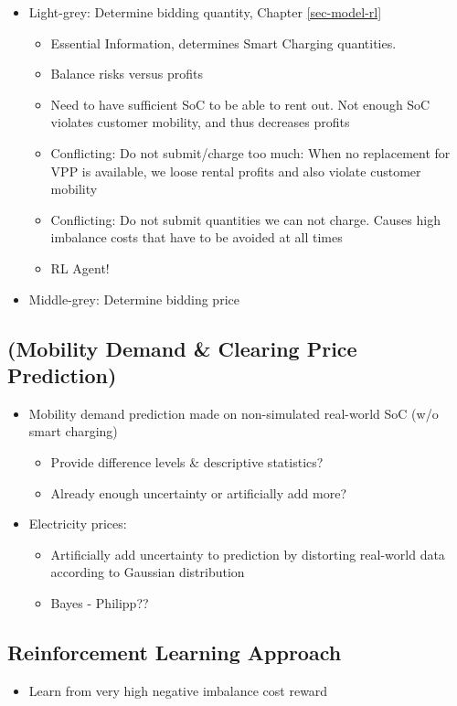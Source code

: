\documentclass[a4paper, 12pt]{article}
\begin{document}
\begin{itemize}
\item Light-grey: Determine bidding quantity, Chapter \ref{sec-model-rl}
\begin{itemize}
\item Essential Information, determines Smart Charging quantities.
\item Balance risks versus profits
\item Need to have sufficient SoC to be able to rent out. Not enough SoC violates
customer mobility, and thus decreases profits
\item Conflicting: Do not submit/charge too much: When no replacement for VPP is
available, we loose rental profits and also violate customer mobility
\item Conflicting: Do not submit quantities we can not charge. Causes high
imbalance costs that have to be avoided at all times
\item RL Agent!
\end{itemize}
\item Middle-grey: Determine bidding price \label{sec-model-bidding-strategy}
\end{itemize}

\subsection{(Mobility Demand \& Clearing Price Prediction)}
\label{sec:org38861da}
\begin{itemize}
\item Mobility demand prediction made on non-simulated real-world SoC (w/o smart charging)
\begin{itemize}
\item Provide difference levels \& descriptive statistics?
\item Already enough uncertainty or artificially add more?
\end{itemize}
\item Electricity prices:
\begin{itemize}
\item Artificially add uncertainty to prediction by distorting real-world data
according to Gaussian distribution
\item Bayes - Philipp??
\end{itemize}
\end{itemize}
\subsection{Reinforcement Learning Approach \label{sec-model-rl}}
\label{sec:orgc7f69d7}
\begin{itemize}
\item Learn from very high negative imbalance cost reward
\end{itemize}
\end{document}
